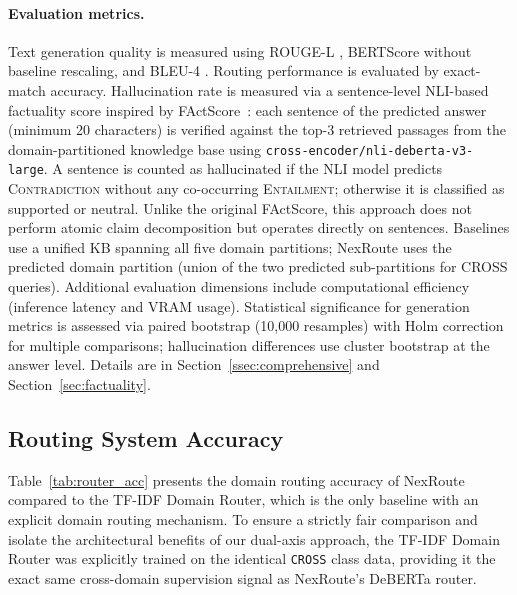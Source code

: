 \documentclass[a4paper,fleql]{cas-sc}
\begin{document}
\paragraph{Evaluation metrics.}
Text generation quality is measured using ROUGE-L \citep{lin2004rouge},
BERTScore \citep{zhang2020bertscore} without baseline rescaling, and BLEU-4
\citep{papineni2002bleu}. Routing performance is evaluated by exact-match
accuracy. Hallucination rate is measured via a sentence-level NLI-based factuality score inspired by FActScore~\citep{min2023factscore}: each sentence of the predicted answer (minimum 20 characters) is verified against the top-3 retrieved passages from the domain-partitioned knowledge base using \texttt{cross-encoder/nli-deberta-v3-large}. A sentence is counted as hallucinated if the NLI model predicts \textsc{Contradiction} without any co-occurring \textsc{Entailment}; otherwise it is classified as supported or neutral. Unlike the original FActScore, this approach does not perform atomic claim decomposition but operates directly on sentences. Baselines use a unified KB spanning all five domain partitions; NexRoute uses the predicted domain partition (union of the two predicted sub-partitions for CROSS queries).
Additional evaluation dimensions include computational efficiency (inference
latency and VRAM usage).
Statistical significance for generation metrics is assessed via paired bootstrap
(10,000 resamples) with Holm correction for multiple comparisons; hallucination
differences use cluster bootstrap at the answer level. Details are in
Section~\ref{ssec:comprehensive} and Section~\ref{sec:factuality}.

\subsection{Routing System Accuracy}
\label{ssec:router}
Table~\ref{tab:router_acc} presents the domain routing accuracy of NexRoute
compared to the TF-IDF Domain Router, which is the only baseline with an explicit domain routing mechanism.
To ensure a strictly fair comparison and isolate the architectural
benefits of our dual-axis approach, the TF-IDF Domain Router was explicitly
trained on the identical \texttt{CROSS} class data, providing it the exact
same cross-domain supervision signal as NexRoute's DeBERTa router.
\end{document}
